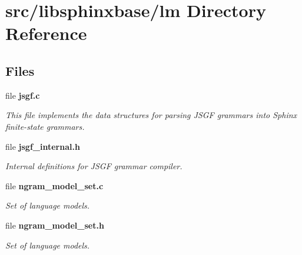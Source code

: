 \section{src/libsphinxbase/lm Directory Reference}
\label{dir_60aae0458aa1ecc8feb93296b73d98ea}
\subsection*{Files}
\begin{DoxyCompactItemize}
\item 
file \textbf{ jsgf.\+c}
\begin{DoxyCompactList}\small\item\em This file implements the data structures for parsing J\+S\+GF grammars into Sphinx finite-\/state grammars. \end{DoxyCompactList}\item 
file \textbf{ jsgf\+\_\+internal.\+h}
\begin{DoxyCompactList}\small\item\em Internal definitions for J\+S\+GF grammar compiler. \end{DoxyCompactList}\item 
file \textbf{ ngram\+\_\+model\+\_\+set.\+c}
\begin{DoxyCompactList}\small\item\em Set of language models. \end{DoxyCompactList}\item 
file \textbf{ ngram\+\_\+model\+\_\+set.\+h}
\begin{DoxyCompactList}\small\item\em Set of language models. \end{DoxyCompactList}\end{DoxyCompactItemize}
